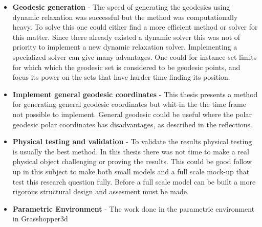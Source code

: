 \begin{itemize}
    \item \textbf{Geodesic generation} - The speed of generating the geodesics using dynamic relaxation was successful but the method was computationally heavy. To solve this one could either find a more efficient method or solver for this matter. Since there already existed a dynamic solver this was not of priority to implement a new dynamic relaxation solver. Implementing a specialized solver can give many advantages. One could for instance set limits for which which the geodesic set is considered to be geodesic points, and focus its power on the sets that have harder time finding its position.
    
    \item \textbf{Implement general geodesic coordinates} - This thesis presents a method for generating general geodesic coordinates but whit-in the the time frame not possible to implement. General geodesic could be useful where the polar geodesic polar coordinates has disadvantages, as described in the reflections. 
    
    \item \textbf{Physical testing and validation} - To validate the results physical testing is usually the best method. In this thesis there was not time to make a real physical object challenging or proving the results. This could be good follow up in this subject to make both small models and a full scale mock-up that test this research question fully. Before a full scale model can be built a more rigorous structural design and assesment must be made.
    
   \item \textbf{Parametric Environment} - The work done in the parametric environment in Grasshopper3d   
   
    
\end{itemize}
